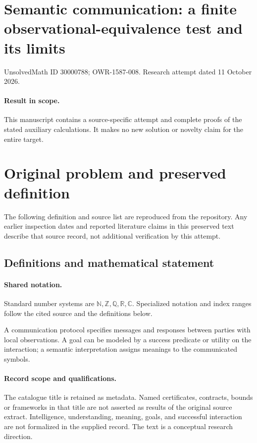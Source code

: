 \documentclass[11pt]{article}
\begin{document}
\section*{Semantic communication: a finite observational-equivalence test and its limits}
\noindent UnsolvedMath ID 30000788; OWR-1587-008. Research attempt dated 11 October 2026.
\paragraph{Result in scope.}This manuscript contains a source-specific attempt and complete proofs of the stated auxiliary calculations. It makes no new solution or novelty claim for the entire target.
\section{Original problem and preserved definition}
The following definition and source list are reproduced from the repository. Any earlier inspection dates and reported literature claims in this preserved text describe that source record, not additional verification by this attempt.
\subsection{Definitions and mathematical statement}

\paragraph{Shared notation.}Standard number systems are $\mathbb N,\mathbb Z,\mathbb Q,\mathbb R,\mathbb C$. Specialized notation and index ranges follow the cited source and the definitions below.


A communication protocol specifies messages and responses between parties with local observations. A goal can be modeled by a success predicate or utility on the interaction; a semantic interpretation assigns meanings to the communicated symbols.
\paragraph{Record scope and qualifications.}
The catalogue title is retained as metadata. Named certificates, contracts, bounds or frameworks in that title are not asserted as results of the original source extract.
Intelligence, understanding, meaning, goals, and successful interaction are not formalized in the supplied record. The text is a conceptual research direction.
\end{document}
